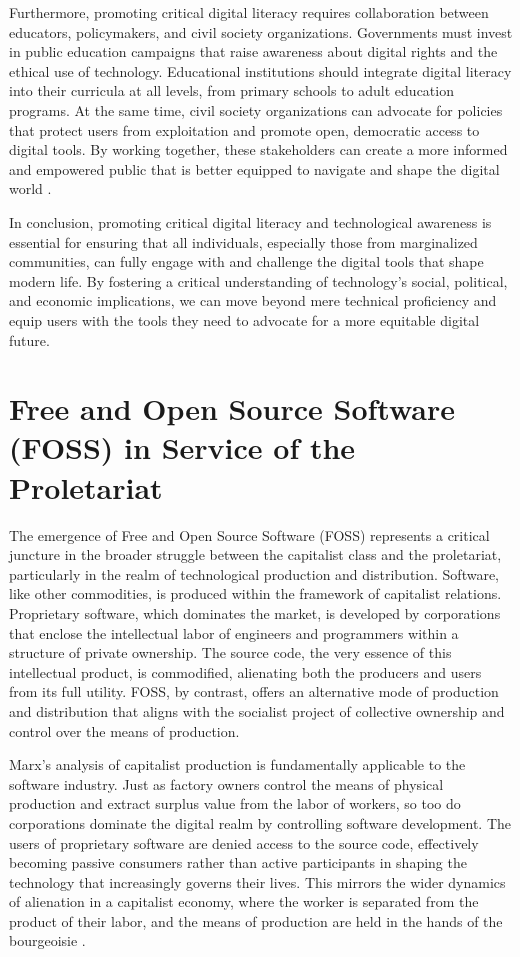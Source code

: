 \begin{refsection}
Furthermore, promoting critical digital literacy requires collaboration between educators, policymakers, and civil society organizations. Governments must invest in public education campaigns that raise awareness about digital rights and the ethical use of technology. Educational institutions should integrate digital literacy into their curricula at all levels, from primary schools to adult education programs. At the same time, civil society organizations can advocate for policies that protect users from exploitation and promote open, democratic access to digital tools. By working together, these stakeholders can create a more informed and empowered public that is better equipped to navigate and shape the digital world \cite[pp.~45-48]{fuchscriticalcommunication}.

In conclusion, promoting critical digital literacy and technological awareness is essential for ensuring that all individuals, especially those from marginalized communities, can fully engage with and challenge the digital tools that shape modern life. By fostering a critical understanding of technology’s social, political, and economic implications, we can move beyond mere technical proficiency and equip users with the tools they need to advocate for a more equitable digital future.

\section{Free and Open Source Software (FOSS) in Service of the Proletariat}

The emergence of Free and Open Source Software (FOSS) represents a critical juncture in the broader struggle between the capitalist class and the proletariat, particularly in the realm of technological production and distribution. Software, like other commodities, is produced within the framework of capitalist relations. Proprietary software, which dominates the market, is developed by corporations that enclose the intellectual labor of engineers and programmers within a structure of private ownership. The source code, the very essence of this intellectual product, is commodified, alienating both the producers and users from its full utility. FOSS, by contrast, offers an alternative mode of production and distribution that aligns with the socialist project of collective ownership and control over the means of production.

Marx’s analysis of capitalist production is fundamentally applicable to the software industry. Just as factory owners control the means of physical production and extract surplus value from the labor of workers, so too do corporations dominate the digital realm by controlling software development. The users of proprietary software are denied access to the source code, effectively becoming passive consumers rather than active participants in shaping the technology that increasingly governs their lives. This mirrors the wider dynamics of alienation in a capitalist economy, where the worker is separated from the product of their labor, and the means of production are held in the hands of the bourgeoisie \cite[pp.~78]{marx1867}.


\end{refsection}
